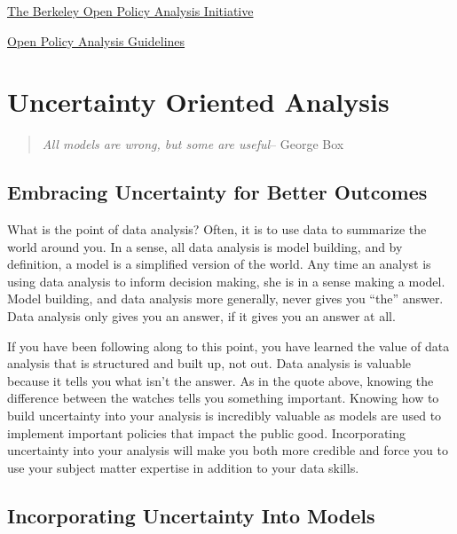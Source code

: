 \documentclass[
]{book}
\begin{document}
\href{https://www.bitss.org/opa/}{The Berkeley Open Policy Analysis Initiative}

\href{https://www.bitss.org/wp-content/uploads/2019/03/OPA-Guidelines.pdf}{Open Policy Analysis Guidelines}

\hypertarget{uncertainty-oriented-analysis}{%
\chapter{Uncertainty Oriented Analysis}\label{uncertainty-oriented-analysis}}

\begin{quote}
\emph{All models are wrong, but some are useful}-- George Box
\end{quote}

\hypertarget{embracing-uncertainty-for-better-outcomes}{%
\section{Embracing Uncertainty for Better Outcomes}\label{embracing-uncertainty-for-better-outcomes}}

What is the point of data analysis? Often, it is to use data to summarize the world around you. In a sense, all data analysis is model building, and by definition, a model is a simplified version of the world. Any time an analyst is using data analysis to inform decision making, she is in a sense making a model. Model building, and data analysis more generally, never gives you ``the'' answer. Data analysis only gives you an answer, if it gives you an answer at all.

If you have been following along to this point, you have learned the value of data analysis that is structured and built up, not out. Data analysis is valuable because it tells you what isn't the answer. As in the quote above, knowing the difference between the watches tells you something important. Knowing how to build uncertainty into your analysis is incredibly valuable as models are used to implement important policies that impact the public good. Incorporating uncertainty into your analysis will make you both more credible and force you to use your subject matter expertise in addition to your data skills.

\hypertarget{incorporating-uncertainty-into-models}{%
\section{Incorporating Uncertainty Into Models}\label{incorporating-uncertainty-into-models}}
\end{document}
